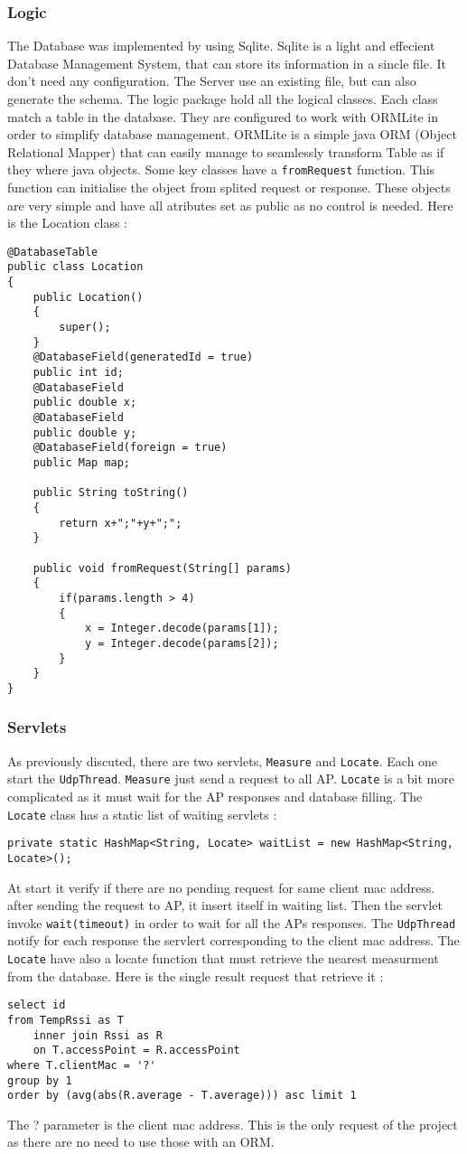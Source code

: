 \subsubsection{Logic}
The Database was implemented by using Sqlite. Sqlite is a light and effecient Database Management System, that can store its information in a sincle file. It don't need any configuration. The Server use an existing file, but can also generate the schema.
The logic package hold all the logical classes. Each class match a table in the database. They are configured to work with ORMLite in order to simplify database management. ORMLite is a simple java ORM (Object Relational Mapper) that can easily manage to seamlessly transform Table as if they where java objects. Some key classes have a \verb+fromRequest+ function. This function can initialise the object from splited request or response. These objects are very simple and have all atributes set as public as no control is needed.
Here is the Location class :
\begin{lstlisting}
@DatabaseTable
public class Location
{
	public Location()
	{
		super();
	}
	@DatabaseField(generatedId = true)
	public int id;
	@DatabaseField
	public double x;
	@DatabaseField
	public double y;
	@DatabaseField(foreign = true)
	public Map map;
	
	public String toString()
	{
		return x+";"+y+";";
	}

	public void fromRequest(String[] params)
	{
		if(params.length > 4)
		{
			x = Integer.decode(params[1]);
			y = Integer.decode(params[2]);
		}
	}
}
\end{lstlisting}

\subsubsection{Servlets}
As previously discuted, there are two servlets, \verb+Measure+ and \verb+Locate+. Each one start the \verb+UdpThread+.
\verb+Measure+ just send a request to all AP. \verb+Locate+ is a bit more complicated as it must wait for the AP responses and database filling. The \verb+Locate+ class has a static list of waiting servlets :
\begin{lstlisting}
private static HashMap<String, Locate> waitList = new HashMap<String, Locate>();
\end{lstlisting}
At start it verify if there are no pending request for same client mac address. after sending the request to AP, it insert itself in waiting list. Then the servlet invoke \verb+wait(timeout)+ in order to wait for all the APs responses. The \verb+UdpThread+ notify for each response the servlert corresponding to the client mac address.
The \verb+Locate+ have also a locate function that must retrieve the nearest measurment from the database.
Here is the single result request that retrieve it :
\begin{lstlisting}
select id
from TempRssi as T
	inner join Rssi as R
	on T.accessPoint = R.accessPoint
where T.clientMac = '?'
group by 1
order by (avg(abs(R.average - T.average))) asc limit 1
\end{lstlisting}
The ? parameter is the client mac address. This is the only request of the project as there are no need to use those with an ORM.


